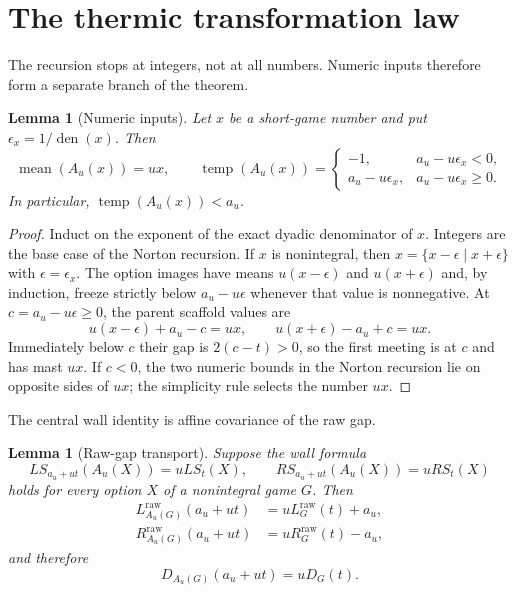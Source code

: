 \documentclass[11pt]{article}
\newtheorem{lemma}[theorem]{Lemma}
\theoremstyle{definition}
\theoremstyle{remark}
\newcommand{\temp}{\operatorname{temp}}
\newcommand{\mean}{\operatorname{mean}}
\newcommand{\den}{\operatorname{den}}
\begin{document}
\section{The thermic transformation law}

The recursion stops at integers, not at all numbers.  Numeric inputs therefore
form a separate branch of the theorem.

\begin{lemma}[Numeric inputs]\label{lem:numbers}
Let $x$ be a short-game number and put $\epsilon_x=1/\den(x)$.  Then
\[
 \mean(A_u(x))=ux,
 \qquad
 \temp(A_u(x))=
 \begin{cases}
   -1,&a_u-u\epsilon_x<0,\\
   a_u-u\epsilon_x,&a_u-u\epsilon_x\ge0.
 \end{cases}
\]
In particular, $\temp(A_u(x))<a_u$.
\end{lemma}

\begin{proof}
Induct on the exponent of the exact dyadic denominator of $x$.  Integers are
the base case of the Norton recursion.  If $x$ is nonintegral, then
$x=\{x-\epsilon\mid x+\epsilon\}$ with
$\epsilon=\epsilon_x$.  The option images have means
$u(x-\epsilon)$ and $u(x+\epsilon)$ and, by induction, freeze strictly below
$a_u-u\epsilon$ whenever that value is nonnegative.  At
$c=a_u-u\epsilon\ge0$, the parent scaffold values are
\[
 u(x-\epsilon)+a_u-c=ux,\qquad
 u(x+\epsilon)-a_u+c=ux.
\]
Immediately below $c$ their gap is $2(c-t)>0$, so the first meeting is at
$c$ and has mast $ux$.  If $c<0$, the two numeric bounds in the Norton
recursion lie on opposite sides of $ux$; the simplicity rule selects
the number $ux$.
\end{proof}

The central wall identity is affine covariance of the raw gap.

\begin{lemma}[Raw-gap transport]\label{lem:gap}
Suppose the wall formula
\[
 LS_{a_u+ut}(A_u(X))=uLS_t(X),\qquad
 RS_{a_u+ut}(A_u(X))=uRS_t(X)
\]
holds for every option $X$ of a nonintegral game $G$.  Then
\begin{align}
 L_{A_u(G)}^{\mathrm{raw}}(a_u+ut)
   &=uL_G^{\mathrm{raw}}(t)+a_u,\\
 R_{A_u(G)}^{\mathrm{raw}}(a_u+ut)
   &=uR_G^{\mathrm{raw}}(t)-a_u,
\end{align}
and therefore
\begin{equation}
 D_{A_u(G)}(a_u+ut)=uD_G(t).
\end{equation}
\end{lemma}
\end{document}
